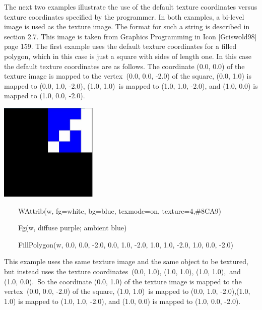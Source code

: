 \documentclass[letterpaper]{article}
\begin{document}
\bigskip

{
The next two examples illustrate the use of the default texture coordinates versus texture coordinates specified by the
programmer. In both examples, a bi-level image is used as the texture image. The format for such a string is described
in section 2.7. This image is taken from Graphics Programming in Icon [Griswold98] page 159. The first example uses the
default texture coordinates for a filled polygon, which in this case is just a square with sides of length one. In this
case the default texture coordinates are as follows. The coordinate \textsf{(0.0, 0.0) }of the texture image is mapped
to the vertex\texttt{ }\textsf{(0.0, 0.0, -2.0)} of the square, \textsf{(0.0, 1.0) }is mapped to \textsf{(0.0, 1.0,
-2.0), (1.0, 1.0)}\texttt{ }is mapped to \textsf{(1.0, 1.0, -2.0)}, and \textsf{(1.0, 0.0) }is mapped to \textsf{(1.0,
0.0, -2.0)}.}


\bigskip

{\centering  \includegraphics[width=1.8335in,height=1.8335in]{utr9/utr9-img030.jpg} \par}

\bigskip


\bigskip

{\sffamily
\ \ \ \ WAttrib(w, {\textquotedbl}fg=white{\textquotedbl}, {\textquotedbl}bg=blue{\textquotedbl},
{\textquotedbl}texmode=on{\textquotedbl}, {\textquotedbl}texture=4,\#8CA9{\textquotedbl})}

{\sffamily
\ \ \ \ Fg(w, {\textquotedbl}diffuse purple; ambient blue{\textquotedbl})}

{\sffamily
\ \ \ \ FillPolygon(w, 0.0, 0.0, -2.0, 0.0, 1.0, -2.0, 1.0, 1.0, -2.0, 1.0, 0.0, -2.0) }


\bigskip

{
This example uses the same texture image and the same object to be textured, but instead uses the texture
coordinates\texttt{ }\textsf{(0.0, 1.0)},\textsf{ (1.0, 1.0)},\textsf{ (1.0, 1.0)},\texttt{ }and\texttt{ }\textsf{(1.0,
0.0)}.\texttt{ }So the coordinate \textsf{(0.0, 1.0) }of the texture image is mapped to the vertex\texttt{
}\textsf{(0.0, 0.0, -2.0)} of the square, \textsf{(1.0, 1.0)}\texttt{ }is mapped to \textsf{(0.0, 1.0, -2.0),(1.0, 1.0)
}is mapped to \textsf{(1.0, 1.0, -2.0),} and \textsf{(1.0},\textsf{ 0.0) }is mapped to \textsf{(1.0, 0.0,
-2.0)}.\texttt{ }}
\end{document}
